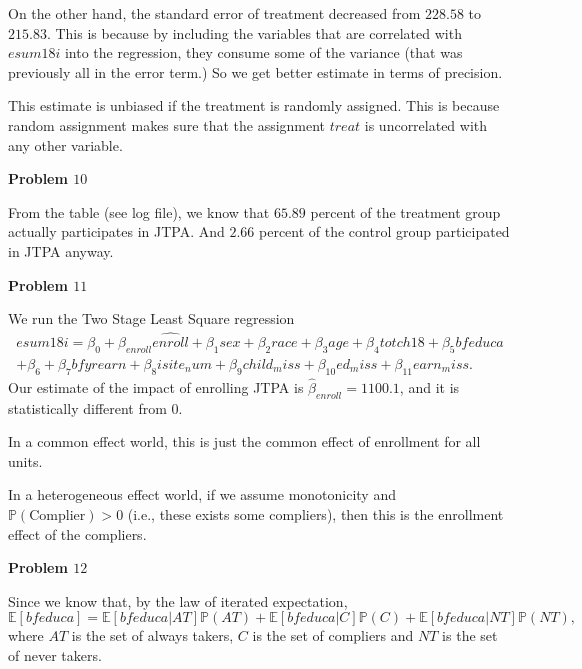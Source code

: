 \documentclass[11pt,a4paper]{amsart}
\theoremstyle{plain}
\theoremstyle{definition}
\begin{document}
On the other hand, the standard error of treatment decreased from $228.58$ to $215.83$. This is because by including the variables that are correlated with $esum18i$ into the regression, they consume some of the variance (that was previously all in the error term.)  So we get better estimate in terms of precision.

This estimate is unbiased if the treatment is randomly assigned. This is because random assignment makes sure that the assignment $treat$ is uncorrelated with any other variable.

\vspace{10pt}
 
\textbf{Problem $10$}\hfil

From the table (see log file), we know that $65.89$ percent of the treatment group actually participates in JTPA. And $2.66$ percent of the control group participated in JTPA anyway.

\vspace{10pt}

\textbf{Problem $11$}\hfil

We run the Two Stage Least Square regression
\[ \begin{aligned}
	esum18i = \beta_{0}  + \beta_{enroll} \widehat{enroll} + \beta_{1}sex + \beta_{2}race + \beta_{3}age + \beta_{4} totch18 + \beta_{5}bfeduca \\
	+ \beta_{6} + \beta_{7} bfyrearn + \beta_{8}i site_num + \beta_{9}child_miss + \beta_{10}ed_miss + \beta_{11} earn_miss.
\end{aligned}	\] 
Our estimate of the impact of enrolling JTPA is $\widehat{ \beta}_{enroll} = 1100.1$, and it is statistically different from $0$.  

In a common effect world, this is just the common effect of enrollment for all units.

In a heterogeneous effect world, if we assume monotonicity and $\mathbb{P}(\text{Complier}) > 0$ (i.e., these exists some compliers), then this is the enrollment effect of the compliers.
 
 \vspace{10pt}
 
 \textbf{Problem $12$}\hfil
 
 Since we know that, by the law of iterated expectation,
 \[		\mathbb{E}\left[bfeduca\right] = \mathbb{E}\left[bfeduca | AT\right] \mathbb{P}(AT) + \mathbb{E}\left[bfeduca | C\right] \mathbb{P}(C) + \mathbb{E}\left[bfeduca | NT\right] \mathbb{P}(NT),	\]
 where  $AT$ is the set of always takers, $C$ is the set of compliers and $NT$ is the set of never takers.
 
\end{document}
